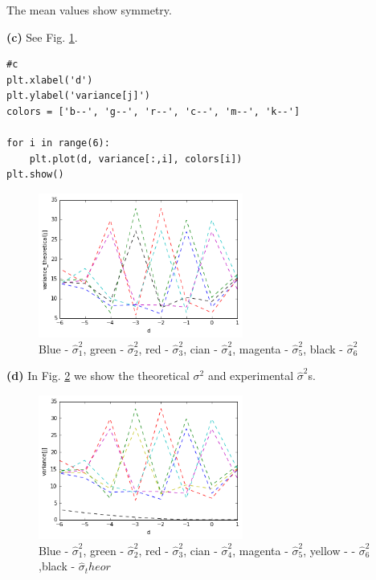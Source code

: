 \documentclass[a4paper, 12pt]{article}
\begin{document}
The mean values show symmetry.

\textbf{(c)}  See Fig. \ref{fig:variance}.

\begin{lstlisting}
#c
plt.xlabel('d')
plt.ylabel('variance[j]')
colors = ['b--', 'g--', 'r--', 'c--', 'm--', 'k--']

for i in range(6):
    plt.plot(d, variance[:,i], colors[i])
plt.show()
\end{lstlisting}


\begin{figure}[h]
  \centering
  \caption{Blue - $\hat{\sigma}_1^2$, green - $\hat{\sigma}_2^2$, red - $\hat{\sigma}_3^2$, cian - $\hat{\sigma}_4^2$, magenta - $\hat{\sigma}_5^2$, black - $\hat{\sigma}_6^2$ \label{fig:variance}}
  \includegraphics[width=0.6\textwidth]{sigmaTh}
\end{figure}

\textbf{(d)}  In Fig. \ref{fig:sigmaTh} we show the theoretical $\sigma^2$ and experimental $\hat{\sigma}^2$s.

\begin{figure}[h]
  \centering
  \caption{Blue - $\hat{\sigma}_1^2$, green - $\hat{\sigma}_2^2$, red - $\hat{\sigma}_3^2$, cian - $\hat{\sigma}_4^2$, magenta - $\hat{\sigma}_5^2$, yellow - - $\hat{\sigma}_6^2$ ,black - $\hat{\sigma}_theor$ \label{fig:sigmaTh}}
  \includegraphics[width=0.6\textwidth]{variance}
\end{figure}
\end{document}
